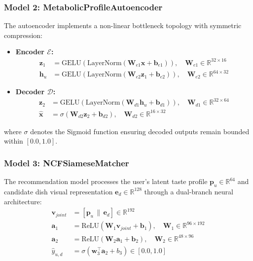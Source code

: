 \documentclass[10pt,journal,compsoc]{IEEEtran}
\begin{document}
\subsubsection{Model 2: MetabolicProfileAutoencoder}
The autoencoder implements a non-linear bottleneck topology with symmetric compression:
\begin{itemize}
    \item \textbf{Encoder $\mathcal{E}$:} 
    \begin{align}
        \mathbf{z}_1 &= \mathrm{GELU}(\mathrm{LayerNorm}(\mathbf{W}_{e1} \mathbf{x} + \mathbf{b}_{e1})), \quad \mathbf{W}_{e1} \in \mathbb{R}^{32 \times 16} \\
        \mathbf{h}_u &= \mathrm{GELU}(\mathrm{LayerNorm}(\mathbf{W}_{e2} \mathbf{z}_1 + \mathbf{b}_{e2})), \quad \mathbf{W}_{e2} \in \mathbb{R}^{64 \times 32}
    \end{align}
    \item \textbf{Decoder $\mathcal{D}$:}
    \begin{align}
        \mathbf{z}_2 &= \mathrm{GELU}(\mathrm{LayerNorm}(\mathbf{W}_{d1} \mathbf{h}_u + \mathbf{b}_{d1})), \quad \mathbf{W}_{d1} \in \mathbb{R}^{32 \times 64} \\
        \hat{\mathbf{x}} &= \sigma(\mathbf{W}_{d2} \mathbf{z}_2 + \mathbf{b}_{d2}), \quad \mathbf{W}_{d2} \in \mathbb{R}^{16 \times 32}
    \end{align}
\end{itemize}
where $\sigma$ denotes the Sigmoid function ensuring decoded outputs remain bounded within $[0.0, 1.0]$.

\subsubsection{Model 3: NCFSiameseMatcher}
The recommendation model processes the user's latent taste profile $\mathbf{p}_u \in \mathbb{R}^{64}$ and candidate dish visual representation $\mathbf{e}_d \in \mathbb{R}^{128}$ through a dual-branch neural architecture:
\begin{align}
    \mathbf{v}_{joint} &= [\mathbf{p}_u \,\|\, \mathbf{e}_d] \in \mathbb{R}^{192} \\
    \mathbf{a}_1 &= \mathrm{ReLU}(\mathbf{W}_1 \mathbf{v}_{joint} + \mathbf{b}_1), \quad \mathbf{W}_1 \in \mathbb{R}^{96 \times 192} \\
    \mathbf{a}_2 &= \mathrm{ReLU}(\mathbf{W}_2 \mathbf{a}_1 + \mathbf{b}_2), \quad \mathbf{W}_2 \in \mathbb{R}^{48 \times 96} \\
    \hat{y}_{u, d} &= \sigma(\mathbf{w}_3^\top \mathbf{a}_2 + b_3) \in [0.0, 1.0]
\end{align}
\end{document}
